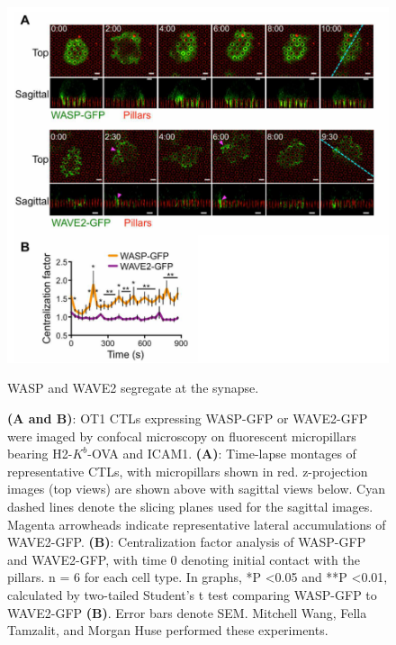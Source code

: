 \begin{figure}[htbp]
	\centering
	\includegraphics[width=\textwidth]{../figures/chapter2/fig5flprobes.png}
	\caption{WASP and WAVE2 segregate at the synapse.}
	\caption*{\textbf{(A and B)}: OT1 CTLs expressing WASP-GFP or WAVE2-GFP were imaged by confocal microscopy on fluorescent micropillars bearing H2-$K^{b}$-OVA and ICAM1. \textbf{(A)}: Time-lapse montages of representative CTLs, with micropillars shown in red. z-projection images (top views) are shown above with sagittal views below. Cyan dashed lines denote the slicing planes used for the sagittal images. Magenta arrowheads indicate representative lateral accumulations of WAVE2-GFP. \textbf{(B)}: Centralization factor analysis of WASP-GFP and WAVE2-GFP, with time 0 denoting initial contact with the pillars. n = 6 for each cell type. In graphs, *P \textless 0.05 and **P \textless 0.01, calculated by two-tailed Student’s t test comparing WASP-GFP to WAVE2-GFP \textbf{(B)}. Error bars denote SEM. Mitchell Wang, Fella Tamzalit, and Morgan Huse performed these experiments.}
	\label{fig:fig5flprobes}
\end{figure}

